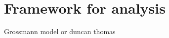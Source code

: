 \section{\noindent \label{sec:Framework}Framework for analysis}

Grossmann model or duncan thomas
  
  